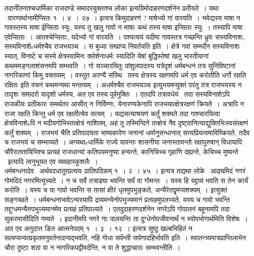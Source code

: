 \documentclass[11pt, openany]{book}
\begin{document}
तदानींतनाश्चधार्मिका राजदण्डे समादरयुक्ताश्च लोका इत्यग्रिमोदाहरणदर्शनेन प्रतीयते~। यथा \textendash\ वारणार्थानामीप्सितः १~। ४~। २७~। इत्यत्र किमुदाहरणं ? माषेभ्यो गां वारयति~। भवेद्यस्य माषा न गावस्तस्य माषा ईप्सिताः स्युः, यस्य तु खलु गावो न माषाः कथं तस्य माषा इप्सिताः स्युः~। तस्यापि माषा एवेप्सिताः~। आतश्चेप्सिताः, यदेभ्यो गां वारयति~। पश्यत्ययं यदीमा गावस्तत्र गच्छन्ति ध्रुवः सस्यविनाशः, सस्यविनाशेsधर्मश्चैव राजभयञ्च~। स बुध्या सम्प्राप्य निवर्तयति इति~। क्षेत्रे गवां सम्मर्देन सस्यविनाशः स्यात्, विनष्टे च सस्ये क्षेत्रस्वामिनः क्लेशेनाधर्मः स्यादिति येषां बुद्धिस्तेषां खलु भारतीयानां कथममङ्गलाशंसनमपि सम्भवति~। गो सञ्चारयितुः पांशुलपादस्य यत्रेदृशं धर्मबन्धनं तत्र सुनिविष्टानां नागरिकाणां किमु वक्तव्यम्~। वस्तुत अरण्यै संस्थि \textendash\ तस्य क्षेत्रस्य रक्षणमपि धर्म एव करोतीति धर्गो रक्षति रक्षितः इति वचनं कथमन्यथा मन्तव्यम्~। {\qt अधर्मश्चैव राजभयञ्च} इत्युभयमप्युक्तं परंतु तत्र राजभयस्य न तादृशः समादरो यादृशो धर्मस्य, अत एव तस्य पूर्वमुक्तिः~। एतदपि तत्रावधेयं \textendash\ तदा सस्यविनाशेऽपि राजकीयः प्रतीकारः समर्थतर आसीत् न निर्विण्णः, येनारण्यकेनापि राजभयात्क्षेत्ररक्षणं क्रियते~। अत्रापि न राजा रक्षति किन्तु धर्म एव रक्षतीत्येव सत्यम्~। यद्यसत्याश्रयणं कर्तुं शक्यते तदा गाश्चारयित्वा क्षेत्रविनाशेsपि न मदीयगोभिस्तत्क्षेत्रं नाशितम्, अहं तु तस्मिन्दिने तत्क्षेत्रं नैव दृष्ट्वानित्याद्युक्तिभिःस्वसंरक्षणं कर्तुं शक्यम्~। राजभयं चैति प्रतिपादयता भाष्यकारेण जनानां धर्मानुसन्धानात् सत्यप्रियत्वमाविष्क्रियते, तदैव च राजभयं च सम्भाव्यते~। अन्यथाsधार्मिके राज्ये यावन्तः शासनीया जनास्तावन्तो रक्षापुरुषान् विधायापि चौरैराततायिभिश्च प्रत्यहं राजधान्यां कतिपयमनुष्या हन्यन्ते, कानिचिच्च गृहाणि दह्यन्ते, केचिच्च मुष्यन्ते \textendash\ इत्यादि त्वनुभूयत एव व्यवहारकुशलैः~।\\

धर्मबन्धनादेव \textendash\ अर्थवदधातुरप्रत्ययः प्रातिपदिकम् १~। २~। ४५~। इत्यत्र तद्यथा लोके \textendash\ आढ्यमिदं नगरं गोमदिदं नगरमित्युच्यते~। न च सर्वे तत्राढ्या भवन्ति सर्वं वा गोमन्तः~। यस्य हि यद्द्रव्यं भवति स तेन कार्यं करोति~। यस्य च या गावो भवन्ति स तासां क्षीरं धृतमुपभुङ्कते, अन्यैरेतद्वृमप्यशक्यम्~। इत्युक्तं सङ्गच्छते~। धर्मबन्धनाभावेऽन्यस्यापि द्रव्यमन्येनोपभुज्यमानं प्रत्यहमुपलभ्यते, यस्य च गावो भवन्ति तद्दुग्धमन्यैरुपभुज्यमानमेव प्रत्यहं प्रतिपाल्यते~। एतदुदाहरणदर्शनेन नगरेऽपि गोपालनं बहूनामपि तदा सुकरमासीदिति गम्यते~। इदानीमपि नगरे गाः पालयन्ति ता दुग्धेनोपजीवनार्थं न स्वोपभोगार्थमिति विशेषः~। अत एव अनुदात्त ङित आत्मनेपदम् १~। ३~। १२~। इत्यत्र सुष्ठु खल्बभिहितं {\qt न सल्वप्यन्यत्प्रकृतमनुवर्तनादन्यद्भवति, नहि गोधा सर्पन्ती सर्पणादहिर्भावति} इति~। स्वातन्त्र्यमात्रप्राप्तिलाभेन चौरा दुष्टाः शठा वा न नागरिकपद्वीमर्दन्ति, न वा ते शुद्धाचाराः सम्भवन्तीति~।\\
\end{document}
